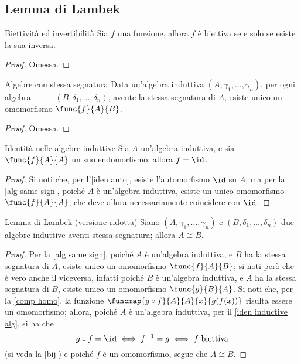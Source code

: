 \documentclass[a4paper, 12pt]{report}
\begin{document}
    \subsection{Lemma di Lambek}

    \begin{framedprop}[label={bij}]{Biettività ed invertibilità}
        Sia $f$ una funzione, allora $f$ è biettiva se e solo se esiste la sua inversa.
    \end{framedprop}

    \begin{proof}
        Omessa.
    \end{proof}

    \begin{framedprop}[label={alg same sign}]{Algebre con stessa segnatura}
        Data un'algebra induttiva $(A, \gamma_1, \ldots, \gamma_n)$, per ogni algebra ---  --- $(B, \delta_1, \ldots, \delta_n)$, avente la stessa segnatura di $A$, esiste unico un omomorfismo $\func{f}{A}{B}$.
    \end{framedprop}

    \begin{proof}
        Omessa.
    \end{proof}

    \begin{framedcor}[label={iden inductive alg}]{Identità nelle algebre induttive}
        Sia $A$ un'algebra induttiva, e sia $\func{f}{A}{A}$ un suo endomorfismo; allora $f = \id$.
    \end{framedcor}

    \begin{proof}
        Si noti che, per l'\cref{iden auto}, esiste l'automorfismo $\id$ su $A$, ma per la \cref{alg same sign}, poiché $A$ è un'algebra induttiva, esiste un unico omomorfismo $\func{f}{A}{A}$, che deve allora necessariamente coincidere con $\id$.
    \end{proof}

    \begin{framedlem}{Lemma di Lambek (versione ridotta)}
        Siano $(A, \gamma_1, \ldots, \gamma_n)$ e $(B, \delta_1, \ldots, \delta_n)$ due algebre induttive aventi stessa segnatura; allora $A \cong B$.
    \end{framedlem}

    \begin{proof}
        Per la \cref{alg same sign}, poiché $A$ è un'algebra induttiva, e $B$ ha la stessa segnatura di $A$, esiste unico un omomorfismo $\func{f}{A}{B}$; si noti però che è vero anche il viceversa, infatti poiché $B$ è un'algebra induttiva, e $A$ ha la stessa segnatura di $B$, esiste unico un omomorfismo $\func{g}{B}{A}$. Si noti che, per la \cref{comp homo}, la funzione $\funcmap{g \circ f}{A}{A}{x}{g(f(x))}$ risulta essere un omomorfismo; allora, poiché $A$ è un'algebra induttiva, per il \cref{iden inductive alg}, si ha che $$g \circ f = \id \iff f^{-1} = g \iff f \ \mathrm{biettiva}$$ (si veda la \cref{bij}) e poiché $f$ è un omomorfismo, segue che $A \cong B$.
    \end{proof}
\end{document}
